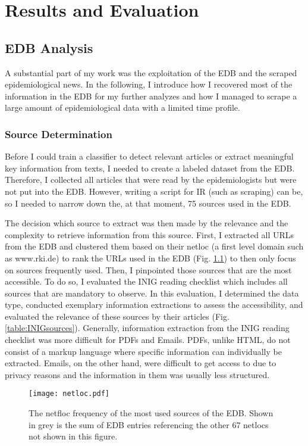 \chapter{Results and Evaluation}

\section{EDB Analysis}\label{edb analysis}
  A substantial part of my work was the exploitation of the EDB and the scraped epidemiological news.
  In the following, I introduce how I recovered most of the information in the EDB for my further analyzes and how I managed to scrape a large amount of epidemiological data with a limited time profile.

\subsection{Source Determination}
  Before I could train a classifier to detect relevant articles or extract meaningful key information from texts, I needed to create a labeled dataset from the EDB.
  Therefore, I collected all articles that were read by the epidemiologists but were not put into the EDB.
  However, writing a script for IR (such as scraping) can be, so I needed to narrow down the, at that moment, 75 sources used in the EDB.

  The decision which source to extract was then made by the relevance and the complexity to retrieve information from this source.
  First, I extracted all URLs from the EDB and clustered them based on their netloc (a first level domain such as www.rki.de) to rank the URLs used in the EDB (Fig. \ref{fig:netloc}) to then only focus on sources frequently used.
  Then, I pinpointed those sources that are the most accessible.
  To do so, I evaluated the INIG reading checklist which includes all sources that are mandatory to observe.
  In this evaluation, I determined the data type, conducted exemplary information extractions to assess the accessibility, and evaluated the relevance of these sources by their articles (Fig. \ref{table:INIGsources}).
  Generally, information extraction from the INIG reading checklist was more difficult for PDFs and Emails.
  PDFs, unlike HTML, do not consist of a markup language where specific information can individually be extracted.
  Emails, on the other hand, were difficult to get access to due to privacy reasons and the information in them was usually less structured.

  \begin{figure}
    \centering
    \texttt{[image: netloc.pdf]}
    \caption{The netfloc frequency of the most used sources of the EDB. Shown in grey is the sum of EDB entries referencing the other 67 netlocs not shown in this figure.}
  \label{fig:netloc}
  \end{figure}

